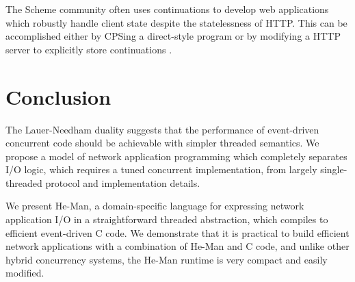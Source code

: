 \documentclass[preprint]{sigplanconf}
\begin{document}
The Scheme community often uses continuations to develop web applications which
robustly handle client state despite the statelessness of HTTP. This can be
accomplished either by CPSing a direct-style program \cite{GraunkeEtAl} or by
modifying a HTTP server to explicitly store continuations \cite{Queinnec}.

\section{Conclusion}

The Lauer-Needham duality suggests that the performance of event-driven
concurrent code should be achievable with simpler threaded semantics. We propose
a model of network application programming which completely separates I/O logic,
which requires a tuned concurrent implementation, from largely single-threaded
protocol and implementation details. 

We present He-Man, a domain-specific language for expressing network application
I/O in a straightforward threaded abstraction, which compiles to efficient
event-driven C code. We demonstrate that it is practical to build efficient
network applications with a combination of He-Man and C code, and unlike other
hybrid concurrency systems, the He-Man runtime is very compact and easily
modified.

{}

\end{document}
